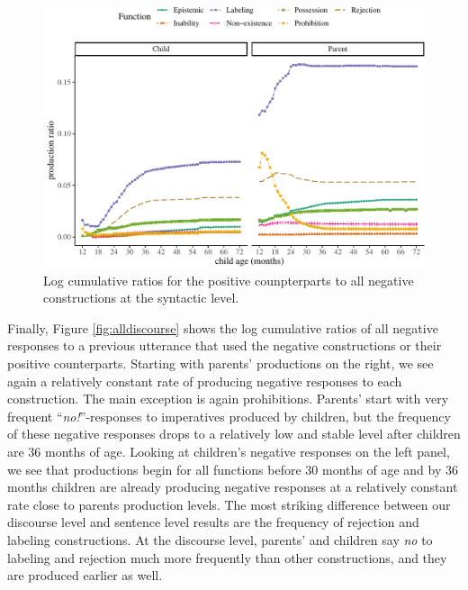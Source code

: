 \documentclass[
  english,
  man,floatsintext]{apa6}
\begin{document}
\begin{figure}[H]

{\centering \includegraphics{neg_construction_article_files/figure-latex/allpos-1} 

}

\caption{Log cumulative ratios for the positive counpterparts to all negative constructions at the syntactic level.}\label{fig:allpos}
\end{figure}

Finally, Figure \ref{fig:alldiscourse} shows the log cumulative ratios of all negative responses to a previous utterance that used the negative constructions or their positive counterparts. Starting with parents' productions on the right, we see again a relatively constant rate of producing negative responses to each construction. The main exception is again prohibitions. Parents' start with very frequent ``\emph{no!}''-responses to imperatives produced by children, but the frequency of these negative responses drops to a relatively low and stable level after children are 36 months of age. Looking at children's negative responses on the left panel, we see that productions begin for all functions before 30 months of age and by 36 months children are already producing negative responses at a relatively constant rate close to parents production levels. The most striking difference between our discourse level and sentence level results are the frequency of rejection and labeling constructions. At the discourse level, parents' and children say \emph{no} to labeling and rejection much more frequently than other constructions, and they are produced earlier as well.
\end{document}
